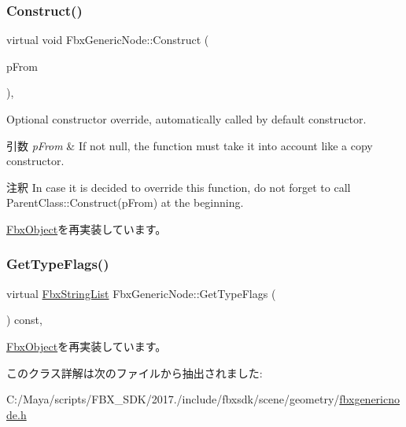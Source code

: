 \subsubsection{\texorpdfstring{Construct()}{Construct()}}
{\footnotesize\ttfamily virtual void Fbx\+Generic\+Node\+::\+Construct (\begin{DoxyParamCaption}\item[{const \hyperlink{class_fbx_object}{Fbx\+Object} $\ast$}]{p\+From }\end{DoxyParamCaption})\hspace{0.3cm}{\ttfamily [protected]}, {\ttfamily [virtual]}}

Optional constructor override, automatically called by default constructor. 
\begin{DoxyParams}{引数}
{\em p\+From} & If not null, the function must take it into account like a copy constructor. \\
\hline
\end{DoxyParams}
\begin{DoxyRemark}{注釈}
In case it is decided to override this function, do not forget to call Parent\+Class\+::\+Construct(p\+From) at the beginning. 
\end{DoxyRemark}


\hyperlink{class_fbx_object_a313503bc645af3fdceb4a99ef5cea7eb}{Fbx\+Object}を再実装しています。

\mbox{\label{class_fbx_generic_node_a348566f1d9605e11b70a36cda95c9afb}} 
\subsubsection{\texorpdfstring{Get\+Type\+Flags()}{GetTypeFlags()}}
{\footnotesize\ttfamily virtual \hyperlink{class_fbx_string_list}{Fbx\+String\+List} Fbx\+Generic\+Node\+::\+Get\+Type\+Flags (\begin{DoxyParamCaption}{ }\end{DoxyParamCaption}) const\hspace{0.3cm}{\ttfamily [protected]}, {\ttfamily [virtual]}}



\hyperlink{class_fbx_object_a6d30a5d00400039a248977cf9f9255b2}{Fbx\+Object}を再実装しています。



このクラス詳解は次のファイルから抽出されました\+:\begin{DoxyCompactItemize}
\item 
C\+:/\+Maya/scripts/\+F\+B\+X\+\_\+\+S\+D\+K/2017./include/fbxsdk/scene/geometry/\hyperlink{fbxgenericnode_8h}{fbxgenericnode.\+h}\end{DoxyCompactItemize}
